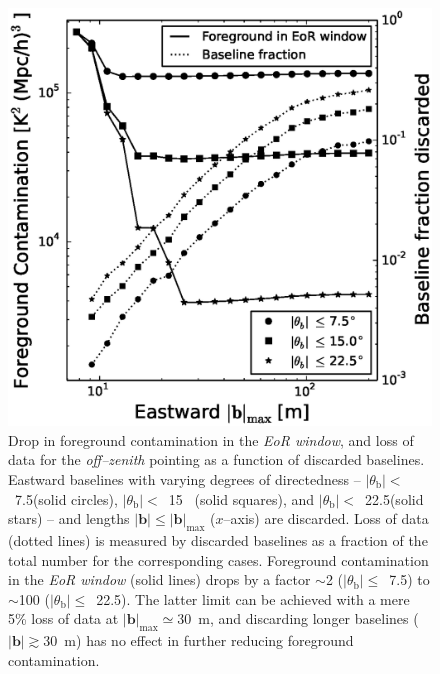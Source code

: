 \documentclass[preprint2,iop,numberedappendix,twocolappendix,appendixfloats]{emulateapj}
\begin{document}
\begin{figure}[htb]
\centering
\includegraphics[width=\linewidth]{figure11.eps}
\caption{Drop in foreground contamination in the {\it EoR window}, and loss of data for the {\it off--zenith} pointing as a function of discarded baselines. Eastward baselines with varying degrees of directedness -- $|\theta_\textrm{b}|<$~7.5\arcdeg (solid circles), $|\theta_\textrm{b}|<$~15\arcdeg~ (solid squares), and $|\theta_\textrm{b}|<$~22.5\arcdeg (solid stars) -- and lengths $|\boldsymbol{b}| \le |\boldsymbol{b}|_\textrm{max}$ ($x$--axis) are discarded. Loss of data (dotted lines) is measured by discarded baselines as a fraction of the total number for the corresponding cases. Foreground contamination in the {\it EoR window} (solid lines) drops by a factor $\sim$2 ($|\theta_\textrm{b}|\le$~7.5\arcdeg) to $\sim$100 ($|\theta_\textrm{b}|\le$~22.5\arcdeg). The latter limit can be achieved with a mere 5\% loss of data at $|\boldsymbol{b}|_\textrm{max}\simeq30$~m, and discarding longer baselines ($|\boldsymbol{b}|\gtrsim 30$~m) has no effect in further reducing foreground contamination. \label{fig:screening}}
\end{figure}
\end{document}

